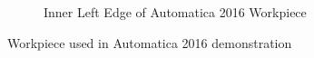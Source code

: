 \begin{figure}[!htbp]
\begin{subfigure}[b]{0.4\textwidth}
		\caption{Inner Left Edge of Automatica 2016 Workpiece}  
		\label{fig:imguc4}
	\end{subfigure}	
\caption{Workpiece used in Automatica 2016 demonstration}
\label{fig:uc2}
\end{figure}

